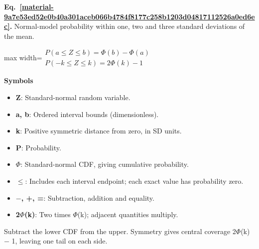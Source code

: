 \documentclass[11pt,a4paper]{article}
\begin{document}
\par\medskip
\begin{samepage}
\label{material-9a7e53ed52e0b40a301aceb066b4784f8177c258b1203d04817112526a0ed6ec}
\noindent\textbf{Eq.~\ref*{material-9a7e53ed52e0b40a301aceb066b4784f8177c258b1203d04817112526a0ed6ec}.} Normal-model probability within one, two and three standard deviations of the mean.\par\nopagebreak
\begin{center}\begin{adjustbox}{max width=\linewidth}$\displaystyle \begin{gathered}P(a\le Z\le b)=\Phi(b)-\Phi(a)\\P(-k\le Z\le k)=2\Phi(k)-1\end{gathered}$\end{adjustbox}\end{center}

\par\noindent\textbf{Symbols}

\begin{itemize}\setlength{\itemsep}{1pt}\setlength{\parsep}{0pt}
\item \textbf{Z}: Standard-normal random variable.
\item \textbf{a, b}: Ordered interval bounds (dimensionless).
\item \textbf{k}: Positive symmetric distance from zero, in SD units.
\item \textbf{P}: Probability.
\item \textbf{\ensuremath{\Phi}}: Standard-normal CDF, giving cumulative probability.
\item \textbf{\ensuremath{\le}}: Includes each interval endpoint; each exact value has probability zero.
\item \textbf{\ensuremath{-}, +, =}: Subtraction, addition and equality.
\item \textbf{2\ensuremath{\Phi}(k)}: Two times \ensuremath{\Phi}(k); adjacent quantities multiply.
\end{itemize}

Subtract the lower CDF from the upper. Symmetry gives central coverage 2\ensuremath{\Phi}(k) \ensuremath{-} 1, leaving one tail on each side.

\end{samepage}
\medskip
\end{document}
